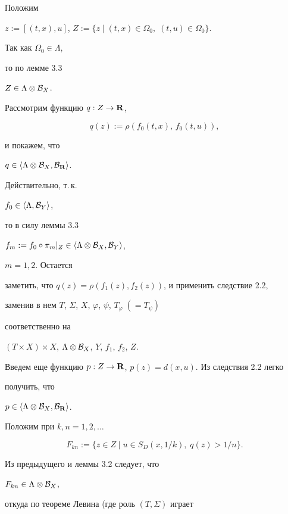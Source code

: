 \begin{pf} Положим


$z:=[(t,x),u]$, $Z:=\{z\mid (t,x)\in\Omega_0,\;(t,u)\in\Omega_0\}$.


Так как $\Omega_0\in\Lambda$,


то по лемме 3.3


$Z\in\Lambda\otimes{\cal B}_X$.


Рассмотрим функцию $q:Z\to\bf R$,


$$


q(z) := \rho(f_0(t,x),\,f_0(t,u)),


$$


и покажем, что


$q\in\langle \Lambda\otimes{\cal B}_X,{\cal B}_{\bold R} \rangle $. 


Действительно, т.\,к.


$f_0\in\langle \Lambda,{\cal B}_Y\rangle $,


то в силу леммы 3.3 


$f_m:=f_0\circ\pi_m|_Z\in\langle\Lambda\otimes{\cal B}_X,{\cal B}_Y\rangle$,


$m=1,2$. Остается


заметить, что $q(z)=\rho(f_1(z),f_2(z))$, и применить следствие 2.2,


заменив в нем $T$, $\Sigma$, $X$, $\varphi$, $\psi$, $T_\varphi\;(=T_\psi)$ 


соответственно на


$(T\times X)\times X$, $\Lambda\otimes{\cal B}_X$, $Y$, $f_1$, $f_2$, $Z$.





Введем еще функцию $p:Z\to{\bold R}$, $p(z)=d(x,u)$. Из следствия 2.2 легко


получить, что


$p\in\langle \Lambda\otimes{\cal B}_X,{\cal B}_{\bold R}\rangle $.





Положим при $k,n=1,2,\dotsc$


$$


F_{kn} := \{z\in Z\mid u\in S_D(x,1/k), \; q(z)>1/n\}.


$$





Из предыдущего и леммы 3.2 следует, что


$F_{kn}\in\Lambda\otimes{\cal B}_X$,


откуда по теореме Левина (где роль $(T,\Sigma)$ играет



\end{pf}
